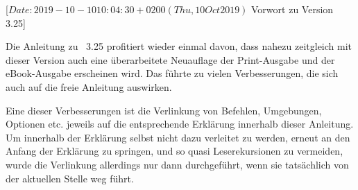 %
%
%
%
%
%
%
%
%

                 [$Date: 2019-10-10 10:04:30 +0200 (Thu, 10 Oct 2019) $
                  Vorwort zu Version 3.25]


Die Anleitung zu \KOMAScript~3.25 profitiert wieder einmal davon, dass nahezu
zeitgleich mit dieser Version auch eine überarbeitete Neuauflage der
Print-Ausgabe \cite{book:komascript} und der eBook-Ausgabe
\cite{ebook:komascript} erscheinen wird. Das führte zu vielen Verbesserungen,
die sich auch auf die freie Anleitung auswirken.

Eine dieser Verbesserungen ist die Verlinkung von Befehlen, Umgebungen,
Optionen etc. jeweils auf die entsprechende Erklärung innerhalb dieser
Anleitung. Um innerhalb der Erklärung selbst nicht dazu verleitet zu werden,
erneut an den Anfang der Erklärung zu springen, und so quasi Leserekursionen
zu vermeiden, wurde die Verlinkung allerdings nur dann durchgeführt, wenn sie
tatsächlich von der aktuellen Stelle weg führt.

